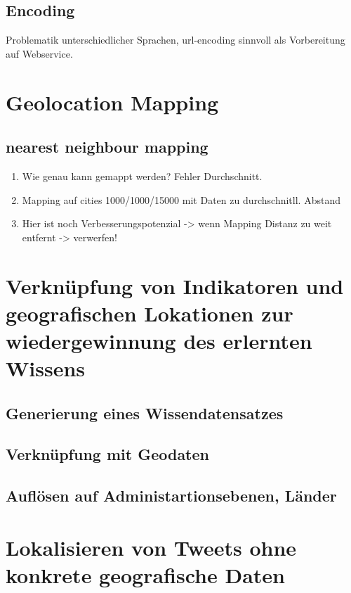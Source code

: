 	\subsection{Encoding}
		Problematik unterschiedlicher Sprachen, 
		url-encoding sinnvoll als Vorbereitung auf Webservice. 

\section{Geolocation Mapping}

	\subsection{nearest neighbour mapping}
		\begin{enumerate}
			\item {} Wie genau kann gemappt werden? Fehler Durchschnitt. 
			\item Mapping auf cities 1000/1000/15000 mit Daten zu durchschnitll. Abstand
			\item Hier ist noch Verbesserungspotenzial -> wenn Mapping Distanz zu weit entfernt -> verwerfen! 
		\end{enumerate} 

\section{Verknüpfung von Indikatoren und geografischen Lokationen zur wiedergewinnung des erlernten Wissens}
	
	\subsection{Generierung eines Wissendatensatzes}

	\subsection{Verknüpfung mit Geodaten}

	\subsection{Auflösen auf Administartionsebenen, Länder}

\section{Lokalisieren von Tweets ohne konkrete geografische Daten}
	
